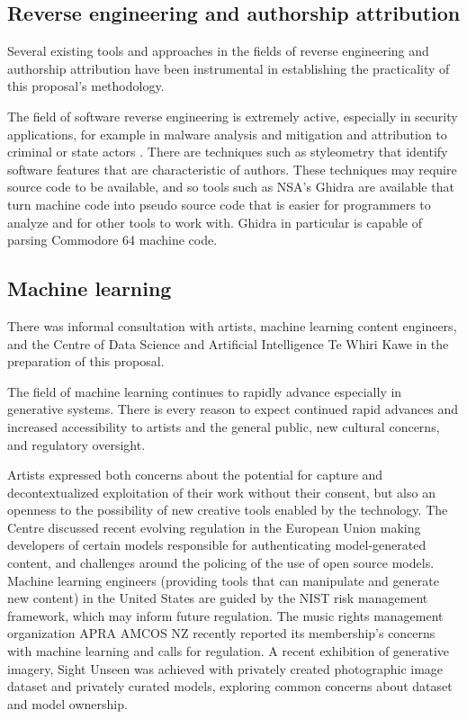 \documentclass[10pt]{article}
\begin{document}
\begin{multicols*}{2}
\subsection{Reverse engineering and authorship attribution}

Several existing tools and approaches in the fields of reverse engineering and authorship attribution have been instrumental in establishing the practicality of this proposal's methodology.

The field of software reverse engineering is extremely active, especially in security applications, for example in malware analysis and mitigation and attribution to criminal or state actors \cite{mohammed2022malgridvisualizationbinaryfeatures}. There are techniques such as styleometry\cite{10.1145/3292577} that identify software features that are characteristic of authors. These techniques may require source code to be available, and so tools such as NSA's Ghidra\cite{ghidra} are available that turn machine code into pseudo source code that is easier for programmers to analyze and for other tools to work with. Ghidra in particular is capable of parsing Commodore 64 machine code.

\subsection{Machine learning}

There was informal consultation with artists, machine learning content engineers, and the Centre of Data Science and Artificial Intelligence Te Whiri Kawe in the preparation of this proposal.

The field of machine learning continues to rapidly advance especially in generative systems. There is every reason to expect continued rapid advances and increased accessibility to artists and the general public, new cultural concerns, and regulatory oversight.

Artists expressed both concerns about the potential for capture and decontextualized exploitation of their work without their consent\cite{datacollect}, but also an openness to the possibility of new creative tools enabled by the technology\cite{creativityai}. The Centre discussed recent evolving regulation in the European Union making developers of certain models responsible for authenticating model-generated content\cite{euairegs}, and challenges around the policing of the use of open source models. Machine learning engineers (providing tools that can manipulate and generate new content) in the United States are guided by the NIST risk management framework\cite{nistai}, which may inform future regulation. The music rights management organization APRA AMCOS NZ recently reported its membership's concerns with machine learning and calls for regulation\cite{aprastory}. A recent exhibition of generative imagery, Sight Unseen\cite{sightunseen} was achieved with privately created photographic image dataset and privately curated models, exploring common concerns about dataset and model ownership. 


\end{multicols*}
\end{document}
